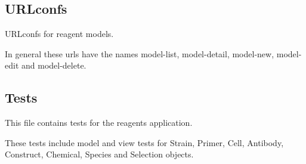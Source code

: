 \documentclass[letterpaper,10pt,english]{sphinxmanual}
\begin{document}
\subsection{URLconfs}
\label{api:id25}\label{api:module-experimentdb.reagents.urls}
URLconfs for reagent models.


In general these urls have the names model-list, model-detail, model-new, model-edit and model-delete.



\subsection{Tests}
\label{api:id26}\label{api:module-experimentdb.reagents.tests}
This file contains tests for the reagents application.


These tests include model and view tests for Strain, Primer, Cell, Antibody, Construct, Chemical, Species and Selection objects.

\end{document}
